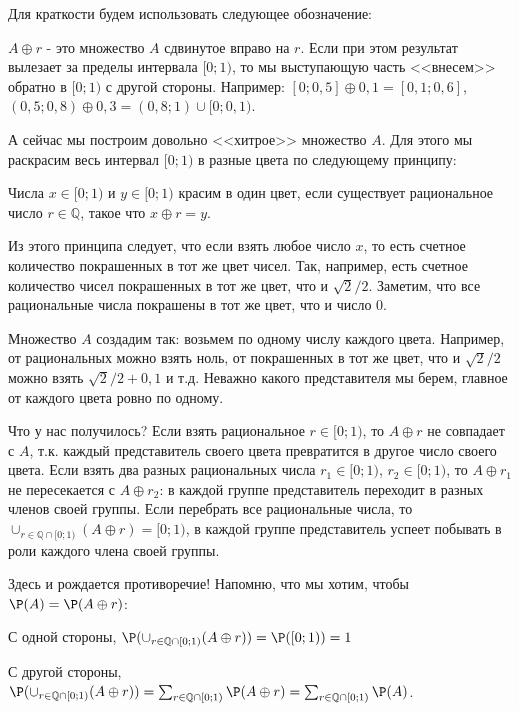 {Для краткости будем использовать следующее обозначение: 

\begin{mydef} $A\oplus r$ - это множество $A$ сдвинутое вправо на $r$. Если при этом результат вылезает за пределы интервала $[0;1)$, то мы выступающую часть <<внесем>> обратно в $[0;1)$ с другой стороны. Например: $[0;0,5]\oplus 0,1=[0,1;0,6]$, $(0,5;0,8)\oplus 0,3=(0,8;1)\cup [0;0,1)$.
\end{mydef}

А сейчас мы построим довольно <<хитрое>> множество $A$. Для этого мы раскрасим весь интервал $[0;1)$ в разные цвета по следующему принципу:

Числа $x\in[0;1)$ и $y\in[0;1)$ красим в один цвет, если существует рациональное число $r\in\mathbb{Q}$, такое что $x\oplus r=y$.

Из этого принципа следует, что если взять любое число $x$, то есть счетное количество покрашенных в тот же цвет чисел. Так, например, есть счетное количество чисел покрашенных в тот же цвет, что и $\sqrt{2}/2$. Заметим, что все рациональные числа покрашены в тот же цвет, что и число $0$.


Множество $A$ создадим так: возьмем по одному числу каждого цвета. Например, от рациональных можно взять ноль, от покрашенных в тот же цвет, что и $\sqrt{2}/2$ можно взять $\sqrt{2}/2+0,1$ и т.д. Неважно какого представителя мы берем, главное от каждого цвета ровно по одному.

Что у нас получилось? Если взять рациональное $r\in[0;1)$, то $A\oplus r$ не совпадает с $A$, т.к. каждый представитель своего цвета превратится в другое число своего цвета. Если взять два разных рациональных числа $r_{1}\in [0;1)$, $r_{2}\in[0;1)$, то $A\oplus r_{1}$ не пересекается с $A\oplus r_{2}$: в каждой группе представитель переходит в разных членов своей группы. Если перебрать все рациональные числа, то $\cup_{r\in\mathbb{Q}\cap [0;1)} (A\oplus r)=[0;1)$, в каждой группе представитель успеет побывать в роли каждого члена своей группы. 

Здесь и рождается противоречие! Напомню, что мы хотим, чтобы $\P(A)=\P(A\oplus r)$:

С одной стороны,  $\P(\cup_{r\in\mathbb{Q}\cap [0;1)} (A\oplus r))=\P([0;1))=1$

С другой стороны, $\P(\cup_{r\in\mathbb{Q}\cap [0;1)} (A\oplus r))=\sum_{r\in\mathbb{Q}\cap [0;1)} \P(A\oplus r)=\sum_{r\in\mathbb{Q}\cap [0;1)} \P(A)$.

}
